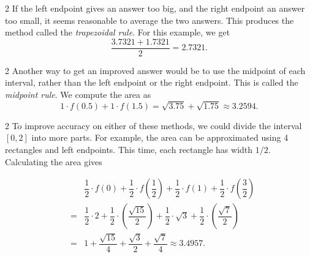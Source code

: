 \documentclass{book}
\begin{document}
\begin{Exam}
\begin{multicols}{2}
If the left endpoint gives an answer too big, and the right endpoint an answer too small, it seems reasonable to average the two answers. This produces the method called the \emph{trapezoidal rule}. For this example, we get \[\dfrac{3.7321+1.7321}{2} = 2.7321.\] \vfill
\begin{center}
\end{center}
\end{multicols}

\begin{multicols}{2}
Another way to get an improved answer would be to use the midpoint of each interval, rather than the left endpoint or the right endpoint. This is called the \emph{midpoint rule}. We compute the area as \[1\cdot f(0.5) + 1\cdot f(1.5) = \sqrt{3.75} + \sqrt{1.75} \approx 3.2594.\]\vfill
\begin{center}
\end{center}
\end{multicols}

\begin{multicols}{2}
To improve accuracy on either of these methods, we could divide the interval $[0,2]$ into more parts. For example, the area can be approximated using 4 rectangles and left endpoints. This time, each rectangle has width $1/2$. Calculating the area gives 

\begin{eqnarray*}
&& \dfrac{1}{2}\cdot f(0) + \dfrac{1}{2}\cdot f\left(\dfrac{1}{2}\right) + \dfrac{1}{2}\cdot f(1) + \dfrac{1}{2}\cdot f\left(\dfrac{3}{2}\right)\\
& =& \dfrac{1}{2}\cdot 2 + \dfrac{1}{2}\cdot \left(\dfrac{\sqrt{15}}{2}\right) + \dfrac{1}{2}\cdot \sqrt{3} + \dfrac{1}{2}\cdot \left(\dfrac{\sqrt{7}}{2}\right) \\
&=& 1 + \dfrac{\sqrt{15}}{4} + \dfrac{\sqrt{3}}{2} + \dfrac{\sqrt{7}}{4} \approx 3.4957.
\end{eqnarray*}\columnbreak


\end{multicols}
\end{Exam}
\end{document}
